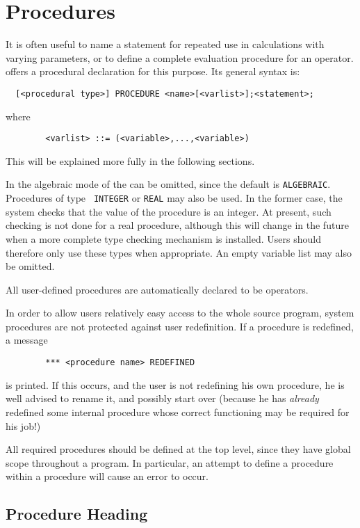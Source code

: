 \chapter{Procedures}
\hypertarget{command:PROCEDURE}{}

It is often useful to name a statement for repeated use in calculations
with varying parameters, or to define a complete evaluation procedure for
an operator. {\REDUCE} offers a procedural declaration for this purpose. Its
general syntax is:
\begin{verbatim}
  [<procedural type>] PROCEDURE <name>[<varlist>];<statement>;
\end{verbatim}
where
\begin{verbatim}
        <varlist> ::= (<variable>,...,<variable>)
\end{verbatim}
This will be explained more fully in the following sections.

In the algebraic mode of {\REDUCE} the {\tt <procedure type>} can be
omitted, since the default is {\tt ALGEBRAIC}.  Procedures of type {\tt
INTEGER} or {\tt REAL} may also be used.  In the former case, the system
checks that the value of the procedure is an integer.  At present, such
checking is not done for a real procedure, although this will change in
the future when a more complete type checking mechanism is installed.
Users should therefore only use these types when appropriate.  An empty
variable list may also be omitted.

All user-defined procedures are automatically declared to be operators.

In order to allow users relatively easy access to the whole {\REDUCE} source
program, system procedures are not protected against user redefinition. If
a procedure is redefined, a message
\begin{verbatim}
        *** <procedure name> REDEFINED
\end{verbatim}
is printed. If this occurs, and the user is not redefining his own
procedure, he is well advised to rename it, and possibly start over
(because he has {\em already\/} redefined some internal procedure whose correct
functioning may be required for his job!)

All required procedures should be defined at the top level, since they
have global scope throughout a program. In particular, an attempt to
define a procedure within a procedure will cause an error to occur.

\section{Procedure Heading}

